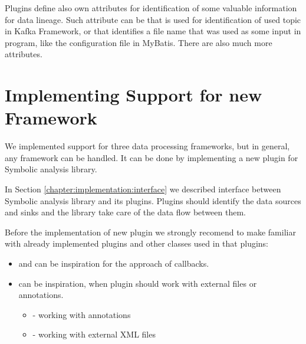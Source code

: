 Plugins define also own attributes for identification of some valuable information
for data lineage.
Such attribute can be  that is used for identification of used
topic in Kafka Framework, or  that identifies a file name that was
used as some input in program, like the configuration file in MyBatis.
There are also much more attributes.




\section{Implementing Support for new Framework}

We implemented support for three data processing frameworks,
but in general, any framework can be handled.
It can be done by implementing a new plugin for Symbolic analysis library.

In Section \ref{chapter:implementation:interface} we described interface between
Symbolic analysis library and its plugins. Plugins should identify the data sources and sinks
and the library take care of the data flow between them.

Before the implementation of new plugin we strongly recomend to make familiar
with already implemented plugins and other classes used in that plugins:
\begin{itemize}
  \item {} and  can be inspiration for the approach of callbacks.
  \item {} can be inspiration, when plugin should work with external files or annotations.
    \begin{itemize}
      \item {} - working with annotations
      \item {} - working with external XML files
    \end{itemize}
\end{itemize}

